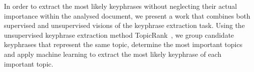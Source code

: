   In order to extract the most likely keyphrases without neglecting their actual
  importance within the analysed document, we present a work that combines both
  supervised and unsupervised visions of the keyphrase extraction task. Using
  the unsupervised keyphrase extraction method
  Topic\-Rank~\cite{bougouin2013topicrank}, we group candidate keyphrases that
  represent the same topic, determine the most important topics and apply
  machine learning to extract the most likely keyphrase of each important topic.


